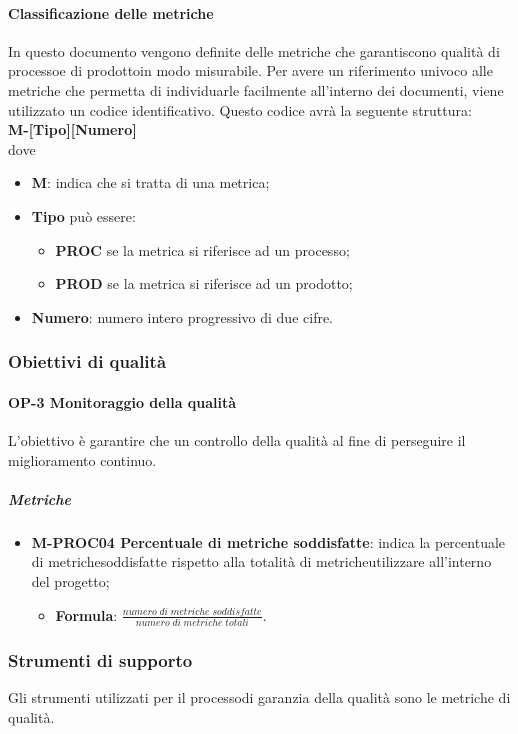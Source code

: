 \paragraph{Classificazione delle metriche}
In questo documento vengono definite delle metriche che garantiscono qualità di processo\glosp e di prodotto\glosp in modo misurabile.
Per avere un riferimento univoco alle metriche che permetta di individuarle facilmente all'interno dei documenti, viene utilizzato un codice identificativo. Questo codice avrà la seguente struttura: \\
\textbf{M-[Tipo][Numero]} \\
dove 
\begin{itemize}
	\item \textbf{M}: indica che si tratta di una metrica;
	\item \textbf{Tipo} può essere:
	\begin{itemize}
		\item \textbf{PROC} se la metrica si riferisce ad un processo;
		\item \textbf{PROD} se la metrica si riferisce ad un prodotto;
	\end{itemize}
	\item \textbf{Numero}: numero intero progressivo di due cifre.
\end{itemize}

\subsubsection{Obiettivi di qualità}
	\paragraph{OP-3 Monitoraggio della qualità}
		L'obiettivo è garantire che un controllo della qualità al fine di perseguire il miglioramento continuo.
		\subparagraph{Metriche}
			\begin{itemize}
				\item \textbf{M-PROC04 Percentuale di metriche soddisfatte}: indica la percentuale di metriche\glosp soddisfatte rispetto alla totalità di metriche\glosp utilizzare all'interno del progetto\glo;
				\begin{itemize}
					\item[] \textbf{Formula}: $\frac{numero \; di \; metriche \; soddisfatte}{numero \; di \; metriche \; totali}$.
				\end{itemize}
			\end{itemize}
\subsubsection{Strumenti di supporto}
Gli strumenti utilizzati per il processo\glosp di garanzia della qualità sono le metriche di qualità.

